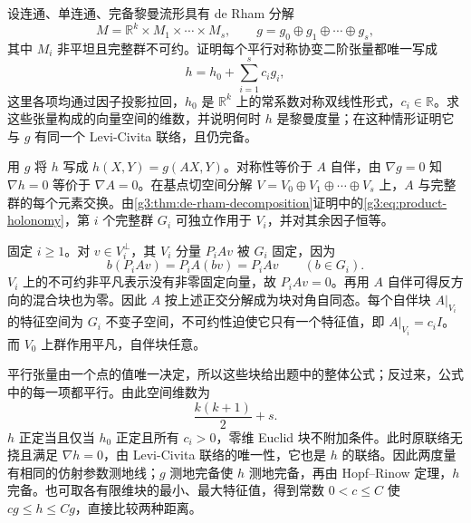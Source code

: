 \begin{exercise}\label{g3:ex:parallel-symmetric-tensors-de-rham}
	设连通、单连通、完备黎曼流形具有 de Rham 分解
	\[
		M=\mathbb R^k\times M_1\times\cdots\times M_s,
		\qquad
		g=g_0\oplus g_1\oplus\cdots\oplus g_s,
	\]
	其中 \(M_i\) 非平坦且完整群不可约。证明每个平行对称协变二阶张量都唯一写成
	\[
		h=h_0+\sum_{i=1}^s c_i g_i,
	\]
	这里各项均通过因子投影拉回，\(h_0\) 是 \(\mathbb R^k\) 上的常系数对称双线性形式，\(c_i\in\mathbb R\)。求这些张量构成的向量空间的维数，并说明何时 \(h\) 是黎曼度量；在这种情形证明它与 \(g\) 有同一个 Levi-Civita 联络，且仍完备。
\end{exercise}
\begin{solution}
	用 \(g\) 将 \(h\) 写成 \(h(X,Y)=g(AX,Y)\)。对称性等价于 \(A\) 自伴，由 \(\nabla g=0\) 知 \(\nabla h=0\) 等价于 \(\nabla A=0\)。在基点切空间分解
	\(V=V_0\oplus V_1\oplus\cdots\oplus V_s\) 上，\(A\) 与完整群的每个元素交换。由\cref{g3:thm:de-rham-decomposition}证明中的\eqref{g3:eq:product-holonomy}，第 \(i\) 个完整群 \(G_i\) 可独立作用于 \(V_i\)，并对其余因子恒等。

	固定 \(i\ge1\)。对 \(v\in V_i^\perp\)，其 \(V_i\) 分量 \(P_iAv\) 被 \(G_i\) 固定，因为
	\[
		b(P_iAv)=P_iA(bv)=P_iAv\qquad(b\in G_i).
	\]
	\(V_i\) 上的不可约非平凡表示没有非零固定向量，故 \(P_iAv=0\)。再用 \(A\) 自伴可得反方向的混合块也为零。因此 \(A\) 按上述正交分解成为块对角自同态。每个自伴块 \(A|_{V_i}\) 的特征空间为 \(G_i\) 不变子空间，不可约性迫使它只有一个特征值，即 \(A|_{V_i}=c_iI\)。而 \(V_0\) 上群作用平凡，自伴块任意。

	平行张量由一个点的值唯一决定，所以这些块给出题中的整体公式；反过来，公式中的每一项都平行。由此空间维数为
	\[
		\frac{k(k+1)}2+s.
	\]
	\(h\) 正定当且仅当 \(h_0\) 正定且所有 \(c_i>0\)，零维 Euclid 块不附加条件。此时原联络无挠且满足 \(\nabla h=0\)，由 Levi-Civita 联络的唯一性，它也是 \(h\) 的联络。因此两度量有相同的仿射参数测地线；\(g\) 测地完备使 \(h\) 测地完备，再由 Hopf--Rinow 定理，\(h\) 完备。也可取各有限维块的最小、最大特征值，得到常数 \(0<c\le C\) 使 \(cg\le h\le Cg\)，直接比较两种距离。
\end{solution}

